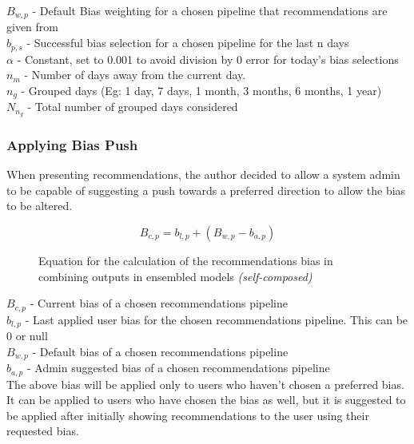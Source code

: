 \noindent $B_{w,p}$ - Default Bias weighting for a chosen pipeline that recommendations are given from\\
$b_{p,s}$ - Successful bias selection for a chosen pipeline for the last n days\\
$\alpha$ - Constant, set to 0.001 to avoid division by 0 error for today's bias selections\\
$n_{m}$ - Number of days away from the current day.\\
$n_{g}$ - Grouped days (Eg: 1 day, 7 days, 1 month, 3 months, 6 months, 1 year)\\
$N_{n_{g}}$ - Total number of grouped days considered




\subsubsection{Applying Bias Push}

When presenting recommendations, the author decided to allow a system admin to be capable of suggesting a push towards a preferred direction to allow the bias to be altered.

\begin{figure}[h!]
\begin{equation}
B_{c,p} = b_{l,p} + \left( B_{w,p} - b_{a,p} \right)
\end{equation}
\caption*{Equation for the calculation of the recommendations bias in combining outputs in ensembled models \textit{(self-composed)}}
\end{figure}

\noindent$B_{c,p}$ - Current bias of a chosen recommendations pipeline\\
$b_{l,p}$ - Last applied user bias for the chosen recommendations pipeline. This can be 0 or null\\
$B_{w,p}$ - Default bias of a chosen recommendations pipeline\\
$b_{a,p}$ - Admin suggested bias of a chosen recommendations pipeline\\

The above bias will be applied only to users who haven't chosen a preferred bias. It can be applied to users who have chosen the bias as well, but it is suggested to be applied after initially showing recommendations to the user using their requested bias.



